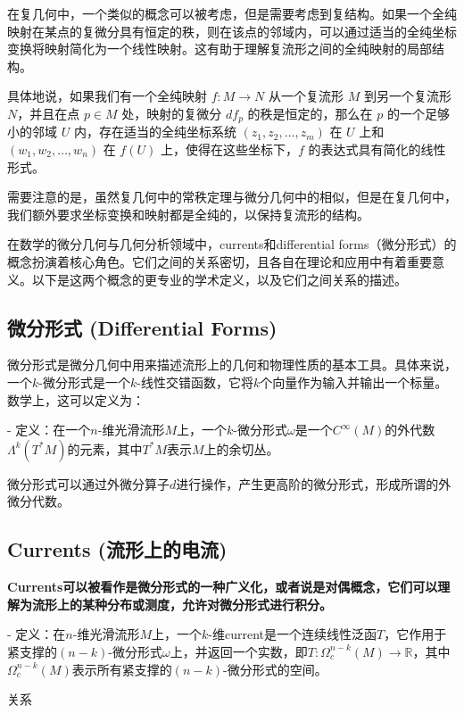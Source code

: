 \documentclass[lang=cn,zihao=-4,a4paper,fontset=none]{beautybook}
\begin{document}
在复几何中，一个类似的概念可以被考虑，但是需要考虑到复结构。如果一个全纯映射在某点的复微分具有恒定的秩，则在该点的邻域内，可以通过适当的全纯坐标变换将映射简化为一个线性映射。这有助于理解复流形之间的全纯映射的局部结构。

具体地说，如果我们有一个全纯映射 \(f: M \to N\) 从一个复流形 \(M\) 到另一个复流形 \(N\)，并且在点 \(p \in M\) 处，映射的复微分 \(df_p\) 的秩是恒定的，那么在 \(p\) 的一个足够小的邻域 \(U\) 内，存在适当的全纯坐标系统 \((z_1, z_2, \ldots, z_m)\) 在 \(U\) 上和 \((w_1, w_2, \ldots, w_n)\) 在 \(f(U)\) 上，使得在这些坐标下，\(f\) 的表达式具有简化的线性形式。

需要注意的是，虽然复几何中的常秩定理与微分几何中的相似，但是在复几何中，我们额外要求坐标变换和映射都是全纯的，以保持复流形的结构。

在数学的微分几何与几何分析领域中，currents和differential forms（微分形式）的概念扮演着核心角色。它们之间的关系密切，且各自在理论和应用中有着重要意义。以下是这两个概念的更专业的学术定义，以及它们之间关系的描述。

\subsection{微分形式 (Differential Forms)}

微分形式是微分几何中用来描述流形上的几何和物理性质的基本工具。具体来说，一个\(k\)-微分形式是一个\(k\)-线性交错函数，它将\(k\)个向量作为输入并输出一个标量。数学上，这可以定义为：

- 定义：在一个\(n\)-维光滑流形\(M\)上，一个\(k\)-微分形式\(\omega\)是一个\(C^\infty(M)\)的外代数\( \Lambda^k(T^*M) \)的元素，其中\(T^*M\)表示\(M\)上的余切丛。

微分形式可以通过外微分算子\(d\)进行操作，产生更高阶的微分形式，形成所谓的外微分代数。

\subsection{Currents (流形上的电流)}

\textbf{Currents可以被看作是微分形式的一种广义化，或者说是对偶概念，它们可以理解为流形上的某种分布或测度，允许对微分形式进行积分。}

- 定义：在\(n\)-维光滑流形\(M\)上，一个\(k\)-维current是一个连续线性泛函\(T\)，它作用于紧支撑的\((n-k)\)-微分形式\(\omega\)上，并返回一个实数，即\(T: \Omega_c^{n-k}(M) \rightarrow \mathbb{R}\)，其中\(\Omega_c^{n-k}(M)\)表示所有紧支撑的\((n-k)\)-微分形式的空间。

关系
\end{document}
